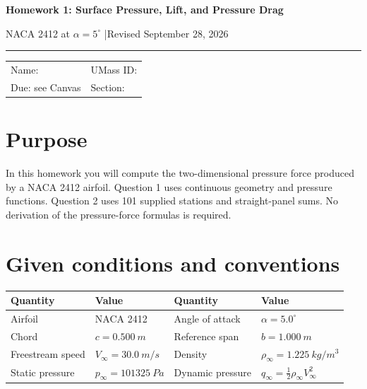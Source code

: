 \documentclass[11pt]{article}
\begin{document}
{\LARGE\bfseries Homework 1: Surface Pressure, Lift, and Pressure Drag}\par
\vspace{2pt}
{\large NACA 2412 at $\alpha=5^{\circ}$ \quad|\quad Revised September 28, 2026}\par
\vspace{6pt}
\hrule
\vspace{8pt}

\begin{tabularx}{\textwidth}{@{}X X@{}}
Name: \hrulefill & UMass ID: \hrulefill\\[7pt]
Due: see Canvas & Section: \hrulefill
\end{tabularx}

\section*{Purpose}
In this homework you will compute the two-dimensional pressure force produced by a NACA 2412 airfoil. Question 1 uses continuous geometry and pressure functions. Question 2 uses 101 supplied stations and straight-panel sums. No derivation of the pressure-force formulas is required.

\begin{center}
\end{center}

\section*{Given conditions and conventions}
\begin{center}
\begin{tabular}{ll@{\qquad}ll}
\toprule
Quantity & Value & Quantity & Value\\
\midrule
Airfoil & NACA 2412 & Angle of attack & $\alpha=5.0^{\circ}$\\
Chord & $c=\SI{0.500}{m}$ & Reference span & $b=\SI{1.000}{m}$\\
Freestream speed & $V_\infty=\SI{30.0}{m/s}$ & Density & $\rho_\infty=\SI{1.225}{kg/m^3}$\\
Static pressure & $p_\infty=\SI{101325}{Pa}$ & Dynamic pressure & $q_\infty=\tfrac12\rho_\infty V_\infty^2$\\
\bottomrule
\end{tabular}
\end{center}
\end{document}
